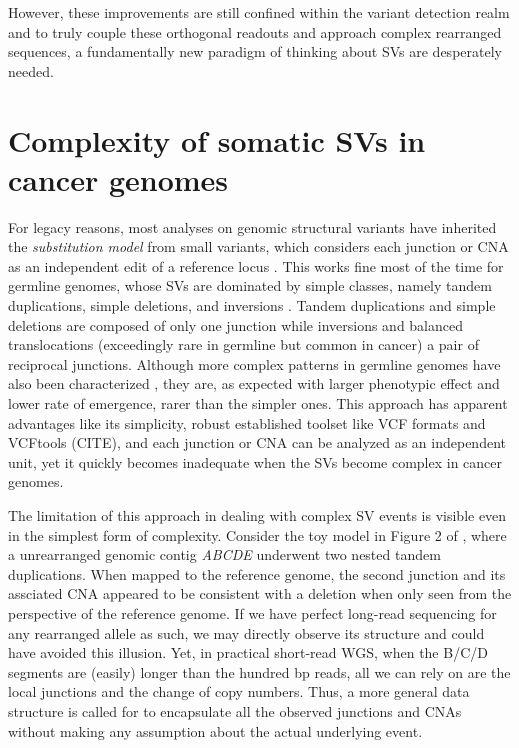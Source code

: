 \documentclass[phd,tocprelim]{cornell}
\begin{document}
However, these improvements are still confined within the variant detection realm and to truly couple these orthogonal readouts and approach complex rearranged sequences, a fundamentally new paradigm of thinking about SVs are desperately needed.

\section{Complexity of somatic SVs in cancer genomes}
For legacy reasons, most analyses on genomic structural variants have inherited the \textit{substitution model} from small variants, which considers each junction or CNA as an independent edit of a reference locus \cite{Li2008-su,Li2009-fv}. This works fine most of the time for germline genomes, whose SVs are dominated by simple classes, namely tandem duplications, simple deletions, and inversions \cite{Collins2020-iv}. Tandem duplications and simple deletions are composed of only one junction while inversions and balanced translocations (exceedingly rare in germline but common in cancer) a pair of reciprocal junctions. Although more complex patterns in germline genomes have also been characterized \cite{Carvalho2011-lb,Collins2020-iv}, they are, as expected with larger phenotypic effect and lower rate of emergence, rarer than the simpler ones. This approach has apparent advantages like its simplicity, robust established toolset like VCF formats and VCFtools (CITE), and each junction or CNA can be analyzed as an independent unit, yet it quickly becomes inadequate when the SVs become complex in cancer genomes.

The limitation of this approach in dealing with complex SV events is visible even in the simplest form of complexity. Consider the toy model in Figure 2 of \cite{Maciejowski2016-nf}, where a unrearranged genomic contig \textit{ABCDE} underwent two nested tandem duplications. When mapped to the reference genome, the second junction and its assciated CNA appeared to be consistent with a deletion when only seen from the perspective of the reference genome. If we have perfect long-read sequencing for any rearranged allele as such, we may directly observe its structure and could have avoided this illusion. Yet, in practical short-read WGS, when the B/C/D segments are (easily) longer than the hundred bp reads, all we can rely on are the local junctions and the change of copy numbers. Thus, a more general data structure is called for to encapsulate all the observed junctions and CNAs without making any assumption about the actual underlying event.
\end{document}

